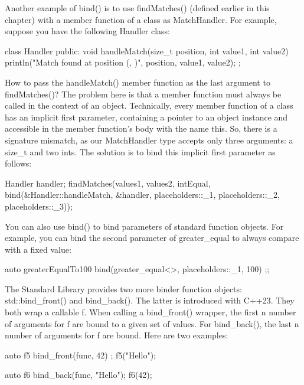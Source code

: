 Another example of bind() is to use findMatches() (defined earlier in this chapter) with a member function of a class as MatchHandler. For example, suppose you have the following Handler class:

\begin{cpp}
class Handler
{
    public:
        void handleMatch(size_t position, int value1, int value2)
        {
            println("Match found at position {} ({}, {})",
                position, value1, value2);
        }
};
\end{cpp}

How to pass the handleMatch() member function as the last argument to findMatches()? The problem here is that a member function must always be called in the context of an object. Technically, every member function of a class has an implicit first parameter, containing a pointer to an object instance and accessible in the member function’s body with the name this. So, there is a signature mismatch, as our MatchHandler type accepts only three arguments: a size\_t and two ints. The solution is to bind this implicit first parameter as follows:

\begin{cpp}
Handler handler;
findMatches(values1, values2, intEqual, bind(&Handler::handleMatch, &handler,
            placeholders::_1, placeholders::_2, placeholders::_3));
\end{cpp}

You can also use bind() to bind parameters of standard function objects. For example, you can bind the second parameter of greater\_equal to always compare with a fixed value:

\begin{cpp}
auto greaterEqualTo100 { bind(greater_equal<>{}, placeholders::_1, 100) };;
\end{cpp}

The Standard Library provides two more binder function objects: std::bind\_front() and bind\_back(). The latter is introduced with C++23. They both wrap a callable f. When calling a bind\_front() wrapper, the first n number of arguments for f are bound to a given set of values. For bind\_back(), the last n number of arguments for f are bound. Here are two examples:

\begin{cpp}
auto f5 { bind_front(func, 42) };
f5("Hello");

auto f6 { bind_back(func, "Hello")};
f6(42);
\end{cpp}

